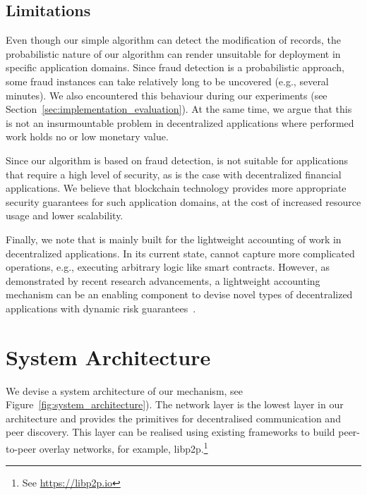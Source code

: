 \subsection{Limitations}
Even though our simple algorithm can detect the modification of records, the probabilistic nature of our algorithm can render \TrustChain{} unsuitable for deployment in specific application domains.
Since fraud detection is a probabilistic approach, some fraud instances can take relatively long to be uncovered (e.g., several minutes).
We also encountered this behaviour during our experiments (see Section~\ref{sec:implementation_evaluation}).
At the same time, we argue that this is not an insurmountable problem in decentralized applications where performed work holds no or low monetary value.

Since our algorithm is based on fraud detection, \TrustChain{} is not suitable for applications that require a high level of security, as is the case with decentralized financial applications.
We believe that blockchain technology provides more appropriate security guarantees for such application domains, at the cost of increased resource usage and lower scalability.

Finally, we note that \TrustChain{} is mainly built for the lightweight accounting of work in decentralized applications.
In its current state, \TrustChain{} cannot capture more complicated operations, e.g., executing arbitrary logic like smart contracts.
However, as demonstrated by recent research advancements, a lightweight accounting mechanism can be an enabling component to devise novel types of decentralized applications with dynamic risk guarantees~\cite{de2021xchange,de2019devid,de2018real}.


\section{System Architecture}
\label{sec:system_architecture}
We devise a system architecture of our \TrustChain{} mechanism, see Figure~\ref{fig:system_architecture}).
The network layer is the lowest layer in our architecture and provides the primitives for decentralised communication and peer discovery.
This layer can be realised using existing frameworks to build peer-to-peer overlay networks, for example, libp2p.\footnote{See \url{https://libp2p.io}}

